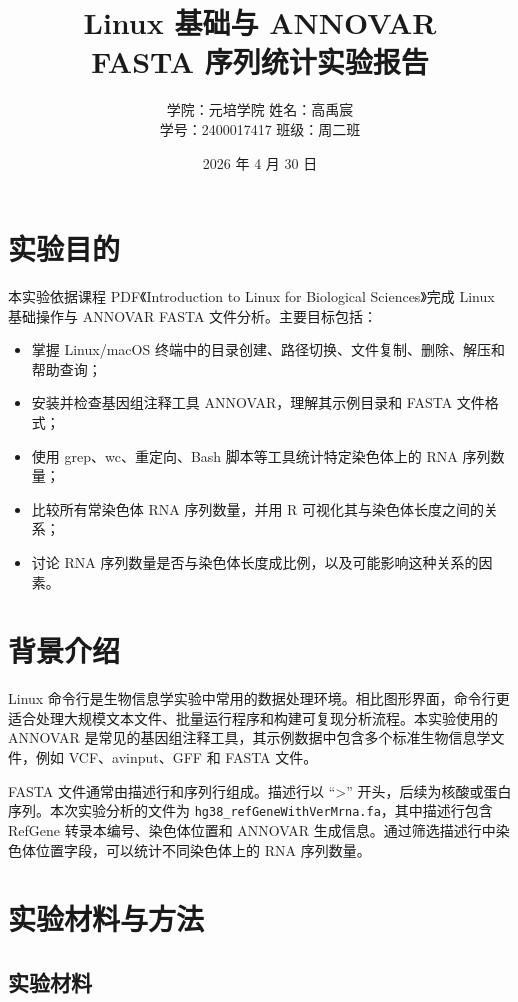 \documentclass[12pt,a4paper,fontset=fandol]{ctexart}
\title{\heiti Linux 基础与 ANNOVAR\\FASTA 序列统计实验报告}
\author{
学院：元培学院 \qquad 姓名：高禹宸\\
学号：2400017417 \qquad 班级：周二班
}
\date{2026 年 4 月 30 日}
\begin{document}
\maketitle
\thispagestyle{empty}

\section{实验目的}

本实验依据课程 PDF《Introduction to Linux for Biological Sciences》完成 Linux 基础操作与 ANNOVAR FASTA 文件分析。主要目标包括：

\begin{itemize}
  \item 掌握 Linux/macOS 终端中的目录创建、路径切换、文件复制、删除、解压和帮助查询；
  \item 安装并检查基因组注释工具 ANNOVAR，理解其示例目录和 FASTA 文件格式；
  \item 使用 grep、wc、重定向、Bash 脚本等工具统计特定染色体上的 RNA 序列数量；
  \item 比较所有常染色体 RNA 序列数量，并用 R 可视化其与染色体长度之间的关系；
  \item 讨论 RNA 序列数量是否与染色体长度成比例，以及可能影响这种关系的因素。
\end{itemize}

\section{背景介绍}

Linux 命令行是生物信息学实验中常用的数据处理环境。相比图形界面，命令行更适合处理大规模文本文件、批量运行程序和构建可复现分析流程。本实验使用的 ANNOVAR 是常见的基因组注释工具，其示例数据中包含多个标准生物信息学文件，例如 VCF、avinput、GFF 和 FASTA 文件。

FASTA 文件通常由描述行和序列行组成。描述行以 ``>'' 开头，后续为核酸或蛋白序列。本次实验分析的文件为 \texttt{hg38\_refGeneWithVerMrna.fa}，其中描述行包含 RefGene 转录本编号、染色体位置和 ANNOVAR 生成信息。通过筛选描述行中染色体位置字段，可以统计不同染色体上的 RNA 序列数量。

\section{实验材料与方法}

\subsection{实验材料}
\end{document}
